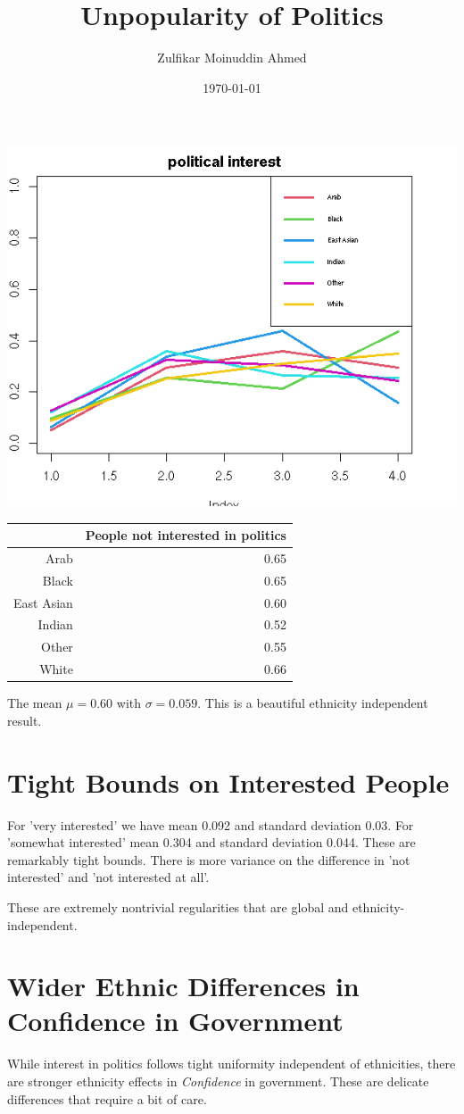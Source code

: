 \documentclass{amsart}
\title{Unpopularity of Politics}
\author{Zulfikar Moinuddin Ahmed}
\date{\today}
\begin{document}
\maketitle

\includegraphics[scale=0.8]{politics.png}

\begin{table}[ht]
\centering
\begin{tabular}{rr}
  \hline
 & People not interested in politics \\ 
  \hline
Arab & 0.65 \\ 
  Black & 0.65 \\ 
  East Asian & 0.60 \\ 
  Indian & 0.52 \\ 
  Other & 0.55 \\ 
  White & 0.66 \\ 
   \hline
\end{tabular}
\end{table}

The mean $\mu=0.60$ with $\sigma=0.059$.  This is a beautiful ethnicity independent result.  

\section{Tight Bounds on Interested People}

For 'very interested' we have mean 0.092 and standard deviation 0.03.  For 'somewhat interested' mean 0.304 and standard deviation 0.044.  These are remarkably tight bounds.  There is more variance on the difference in 'not interested' and 'not interested at all'.

These are extremely nontrivial regularities that are global and ethnicity-independent.

\section{Wider Ethnic Differences in Confidence in Government}

While interest in politics follows tight uniformity independent of ethnicities, there are stronger ethnicity effects in {\em Confidence} in government.  These are delicate differences that require a bit of care.
\end{document}
